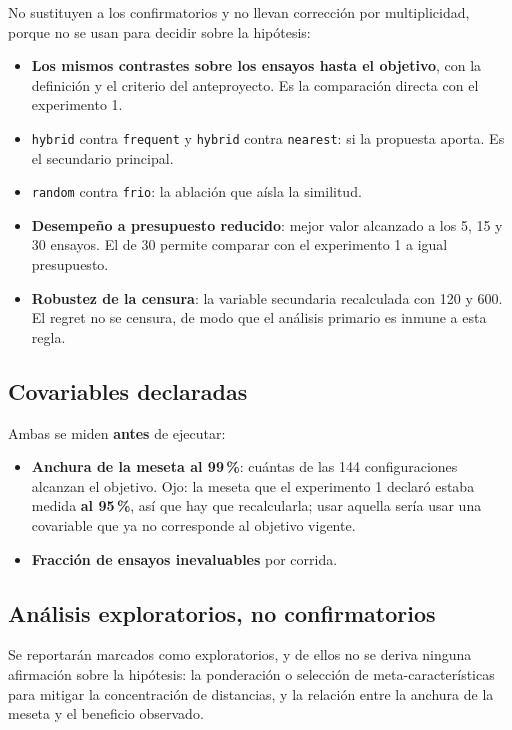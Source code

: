 \documentclass[11pt,letterpaper]{article}
\begin{document}
No sustituyen a los confirmatorios y no llevan corrección por multiplicidad, porque no
se usan para decidir sobre la hipótesis:

\begin{itemize}
  \item \textbf{Los mismos contrastes sobre los ensayos hasta el objetivo}, con la
        definición y el criterio del anteproyecto. Es la comparación directa con el
        experimento 1.
  \item \texttt{hybrid} contra \texttt{frequent} y \texttt{hybrid} contra
        \texttt{nearest}: si la propuesta aporta. Es el secundario principal.
  \item \texttt{random} contra \texttt{frio}: la ablación que aísla la similitud.
  \item \textbf{Desempeño a presupuesto reducido}: mejor valor alcanzado a los 5, 15 y
        30 ensayos. El de 30 permite comparar con el experimento 1 a igual presupuesto.
  \item \textbf{Robustez de la censura}: la variable secundaria recalculada con 120 y
        600. El regret no se censura, de modo que el análisis primario es inmune a
        esta regla.
\end{itemize}

\subsection{Covariables declaradas}

Ambas se miden \textbf{antes} de ejecutar:

\begin{itemize}
  \item \textbf{Anchura de la meseta al 99\,\%}: cuántas de las 144 configuraciones
        alcanzan el objetivo. Ojo: la meseta que el experimento 1 declaró estaba
        medida \textbf{al 95\,\%}, así que hay que recalcularla; usar aquella sería
        usar una covariable que ya no corresponde al objetivo vigente.
  \item \textbf{Fracción de ensayos inevaluables} por corrida.
\end{itemize}

\subsection{Análisis exploratorios, no confirmatorios}

Se reportarán marcados como exploratorios, y de ellos no se deriva ninguna
afirmación sobre la hipótesis: la ponderación o selección de meta-características
para mitigar la concentración de distancias, y la relación entre la anchura de la
meseta y el beneficio observado.
\end{document}
